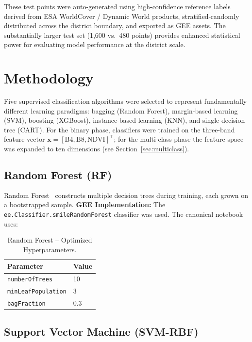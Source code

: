 \documentclass[12pt, a4paper, twocolumn]{article}
\begin{document}
These test points were auto-generated using high-confidence reference labels derived from ESA WorldCover / Dynamic World products, stratified-randomly distributed across the district boundary, and exported as GEE assets.
The substantially larger test set (1,600 vs.\ 480 points) provides enhanced statistical power for evaluating model performance at the district scale.

\section{Methodology}
\label{sec:methodology}

Five supervised classification algorithms were selected to represent fundamentally different learning paradigms: bagging (Random Forest), margin-based learning (SVM), boosting (XGBoost), instance-based learning (KNN), and single decision tree (CART).
For the binary phase, classifiers were trained on the three-band feature vector $\mathbf{x} = [\text{B4}, \text{B8}, \text{NDVI}]^\top$;
for the multi-class phase the feature space was expanded to ten dimensions (see Section~\ref{sec:multiclass}).

\subsection{Random Forest (RF)}
\label{subsec:rf}

Random Forest~\cite{breiman2001random} constructs multiple decision trees during training, each grown on a bootstrapped sample.
\textbf{GEE Implementation:} The \texttt{ee.Classifier.smileRandomForest} classifier was used. The canonical notebook uses:

\begin{table}[H]
\centering
\caption{Random Forest -- Optimized Hyperparameters.}
\label{tab:rf_params}
\begin{tabular}{@{}ll@{}}
\toprule
\textbf{Parameter} & \textbf{Value} \\
\midrule
\texttt{numberOfTrees} & 10 \\
\texttt{minLeafPopulation} & 3 \\
\texttt{bagFraction} & 0.3 \\
\bottomrule
\end{tabular}
\end{table}

\subsection{Support Vector Machine (SVM-RBF)}
\label{subsec:svm}
\end{document}

